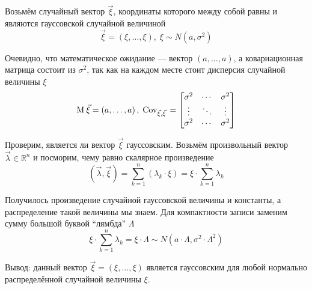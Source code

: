 \begin{example}\label{ex:gaussVectorsIntro}
    Возьмём случайный вектор $\vec{\xi}$, координаты которого между собой равны
    и являются гауссовской случайной величиной
    $$\vec{\xi} = \left( \xi, \dots, \xi \right),\;
        \xi \sim N\left( a, \sigma^2 \right)$$

    Очевидно, что математическое ожидание --- вектор
    $\left( a, \dots, a \right)$, а ковариационная матрица состоит из
    $\sigma^2$, так как на каждом месте стоит дисперсия случайной величины $\xi$
    $$\mathrm{M}_{}\,\vec{\xi} = \left( a, \dots, a \right),\;
        \mathrm{Cov}_{\vec{\xi}, \vec{\xi}}\, =
        \begin{bmatrix}
            \sigma^2 & \cdots & \sigma^2 \\
            \vdots & \ddots & \vdots \\
            \sigma^2 & \cdots & \sigma^2
        \end{bmatrix}$$

    Проверим, является ли вектор $\vec{\xi}$ гауссовским.
    Возьмём произвольный вектор $\vec{\lambda} \in \mathbb{R}^n$
    и посморим, чему равно скалярное произведение
    $$\left( \vec{\lambda}, \vec{\xi} \right)
        = \sum_{k=1}^{n} \left( \lambda_k \cdot \xi \right)
        = \xi \cdot \sum_{k=1}^{n} \lambda_k$$

    Получилось произведение случайной гауссовской величины и константы,
    а распределение такой величины мы знаем. Для компактности записи
    заменим сумму большой буквой ``лямбда'' $\Lambda$
    $$\xi \cdot \sum_{k=1}^{n} \lambda_k
        = \xi \cdot \Lambda \sim N\left( a \cdot \Lambda,
            \sigma^2 \cdot \Lambda^2 \right)$$

    Вывод: данный вектор $\vec{\xi}=\left( \xi, \dots, \xi \right)$ является
    гауссовским для любой нормально распределённой случайной величины $\xi$.
\end{example}

